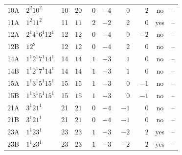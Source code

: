 {\begin{center}
\begin{tabular}{l|l|c|r|r|r|r|r|c|c}
 10A & $2^{2}10^{2}$                  & 10 & $20$              & $\phantom{0}0$ & $-4$ & $\phantom{-}0$  & $\phantom{-}2$  & no  & -- \\
 11A & $1^{2}11^{2}$                  & 11 & $11$              & $\phantom{0}2$ & $-2$ & $\phantom{-}2$  & $\phantom{-}0$  & yes & -- \\
 12A & $2^{1}4^{1}6^{1}12^{1}$        & 12 & $12$              & $\phantom{0}0$ & $-4$ & $\phantom{-}0$  & $-2$ & no  & -- \\
 12B & $12^{2}$                       & 12 & $12$              & $\phantom{0}0$ & $-4$ & $\phantom{-}2$  & $\phantom{-}0$  & no  & -- \\
 14A & $1^{1}2^{1}7^{1}14^{1}$        & 14 & $14$              & $\phantom{0}1$ & $-3$ & $\phantom{-}1$  & $\phantom{-}0$  & no  & -- \\
 14B & $1^{1}2^{1}7^{1}14^{1}$        & 14 & $14$              & $\phantom{0}1$ & $-3$ & $\phantom{-}1$  & $\phantom{-}0$  & no  & -- \\
 15A & $1^{1}3^{1}5^{1}15^{1}$        & 15 & $15$              & $\phantom{0}1$ & $-3$ & $\phantom{-}0$  & $-1$ & no  & -- \\
 15B & $1^{1}3^{1}5^{1}15^{1}$        & 15 & $15$              & $\phantom{0}1$ & $-3$ & $\phantom{-}0$  & $-1$ & no  & -- \\
 21A & $3^{1}21^{1}$                  & 21 & $21$              & $\phantom{0}0$ & $-4$ & $-1$ & $\phantom{-}0$  & no  & -- \\
 21B & $3^{1}21^{1}$                  & 21 & $21$              & $\phantom{0}0$ & $-4$ & $-1$ & $\phantom{-}0$  & no  & -- \\
 23A & $1^{1}23^{1}$                  & 23 & $23$              & $\phantom{0}1$ & $-3$ & $-2$ & $\phantom{-}2$  & yes & -- \\
 23B & $1^{1}23^{1}$                  & 23 & $23$              & $\phantom{0}1$ & $-3$ & $-2$ & $\phantom{-}2$  & yes & -- \\
\bottomrule
\end{tabular}
\end{center}
}

